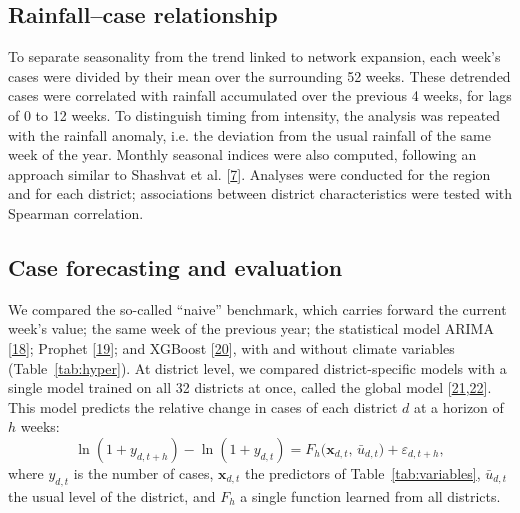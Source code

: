 \documentclass[11pt]{article}
\begin{document}
\subsection{Rainfall–case relationship}
To separate seasonality from the trend linked to network expansion, each week's cases were divided by their mean over the surrounding 52 weeks. These detrended cases were correlated with rainfall accumulated over the previous 4 weeks, for lags of 0 to 12 weeks. To distinguish timing from intensity, the analysis was repeated with the rainfall anomaly, i.e. the deviation from the usual rainfall of the same week of the year. Monthly seasonal indices were also computed, following an approach similar to Shashvat et al. [\hyperlink{ref7}{7}]. Analyses were conducted for the region and for each district; associations between district characteristics were tested with Spearman correlation.

\subsection{Case forecasting and evaluation}
We compared the so-called ``naive'' benchmark, which carries forward the current week's value; the same week of the previous year; the statistical model ARIMA [\hyperlink{ref18}{18}]; Prophet [\hyperlink{ref19}{19}]; and XGBoost [\hyperlink{ref20}{20}], with and without climate variables (Table~\ref{tab:hyper}). At district level, we compared district-specific models with a single model trained on all 32 districts at once, called the global model [\hyperlink{ref21}{21},\hyperlink{ref22}{22}]. This model predicts the relative change in cases of each district $d$ at a horizon of $h$ weeks:
\begin{equation}
\ln(1+y_{d,t+h})-\ln(1+y_{d,t})=F_h\big(\mathbf{x}_{d,t},\,\bar{u}_{d,t}\big)+\varepsilon_{d,t+h} ,
\label{eq:global}
\end{equation}
where $y_{d,t}$ is the number of cases, $\mathbf{x}_{d,t}$ the predictors of Table~\ref{tab:variables}, $\bar{u}_{d,t}$ the usual level of the district, and $F_h$ a single function learned from all districts.
\end{document}
